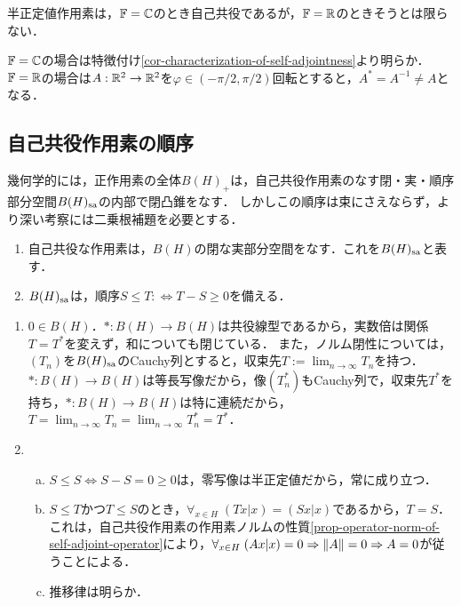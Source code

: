 \documentclass[uplatex,dvipdfmx]{jsreport}
\begin{document}
\begin{lemma}[半正定値作用素の自己共役性]
    半正定値作用素は，$\mathbb{F}=\mathbb{C}$のとき自己共役であるが，$\mathbb{F}=\mathbb{R}$のときそうとは限らない．
\end{lemma}
\begin{Proof}
    $\mathbb{F}=\mathbb{C}$の場合は特徴付け\ref{cor-characterization-of-self-adjointness}より明らか．
    $\mathbb{F}=\mathbb{R}$の場合は$A:\mathbb{R}^2\to\mathbb{R}^2$を$\varphi\in(-\pi/2,\pi/2)$回転とすると，$A^*=A^{-1}\ne A$となる．
\end{Proof}

\subsection{自己共役作用素の順序}

\begin{tcolorbox}[colframe=ForestGreen, colback=ForestGreen!10!white,breakable,colbacktitle=ForestGreen!40!white,coltitle=black,fonttitle=\bfseries\sffamily,
title=]
    幾何学的には，正作用素の全体$B(H)_+$は，自己共役作用素のなす閉・実・順序部分空間$B(H)_{\mathrm{sa}}$の内部で閉凸錐をなす．
    しかしこの順序は束にさえならず，より深い考察には二乗根補題を必要とする．
\end{tcolorbox}

\begin{proposition}\mbox{}
    \begin{enumerate}
        \item 自己共役な作用素は，$B(H)$の閉な実部分空間をなす．これを$B(H)_{\mathrm{sa}}$と表す．
        \item $B(H)_{\mathrm{sa}}$は，順序$S\le T:\Leftrightarrow T-S\ge 0$を備える．
    \end{enumerate}
\end{proposition}
\begin{Proof}\mbox{}
    \begin{enumerate}
        \item $0\in B(H)$．$*:B(H)\to B(H)$は共役線型であるから，実数倍は関係$T=T^*$を変えず，和についても閉じている．
        また，ノルム閉性については，$(T_n)$を$B(H)_{\mathrm{sa}}$のCauchy列とすると，収束先$T:=\lim_{n\to\infty}T_n$を持つ．$*:B(H)\to B(H)$は等長写像だから，像$(T_n^*)$もCauchy列で，収束先$T^*$を持ち，$*:B(H)\to B(H)$は特に連続だから，$T=\lim_{n\to\infty}T_n=\lim_{n\to\infty}T_n^*=T^*$．
        \item \begin{enumerate}[(a)]
            \item $S\le S\Leftrightarrow S-S=0\ge 0$は，零写像は半正定値だから，常に成り立つ．
            \item $S\le T$かつ$T\le S$のとき，$\forall_{x\in H}\;(Tx|x)=(Sx|x)$であるから，$T=S$．これは，自己共役作用素の作用素ノルムの性質\ref{prop-operator-norm-of-self-adjoint-operator}により，$\forall_{x\in H}\;(Ax|x)=0\Rightarrow\|A\|=0\Rightarrow A=0$が従うことによる．
            \item 推移律は明らか．
        \end{enumerate}
    \end{enumerate}
\end{Proof}
\end{document}

